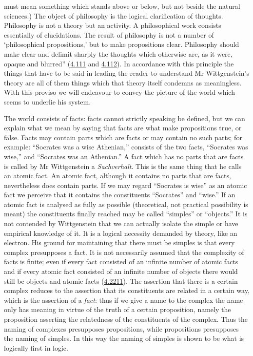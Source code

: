 \documentclass[12pt,oneside]{book}[2007/10/19]
\newcommand{\PropERef}[1]{\hyperref[PropE:#1]{#1}}
\newcommand{\DPtypo}[2]{#2}
\newcommand{\German}[1]{\foreignlanguage{german}{\emph{#1}}}
\begin{document}
must mean something which stands above or below, but
not beside the natural sciences.) The object of philosophy
is the logical clarification of thoughts. Philosophy is not
a theory but an activity. A philosophical work consists
essentially of elucidations. The result of philosophy is
not a number of `philosophical propositions,' but to
make propositions clear. Philosophy should make clear
and delimit sharply the thoughts which otherwise are,
as it were, opaque and blurred'' (\PropERef{4.111} and \PropERef{4.112}). In
accordance with this principle the things that have to be
said in leading the reader to understand Mr Wittgenstein's
theory are all of them things which that theory itself
condemns as meaningless. With this proviso we will
endeavour to convey the picture of the world which
seems to underlie his system.

The world consists of facts: facts cannot strictly
speaking be defined, but we can explain what we mean
by saying that facts are what make propositions true, or
false. Facts may contain parts which are facts or may
contain no such parts; for example: ``Socrates was a wise
Athenian,'' consists of the two facts, ``Socrates was wise,''
and ``Socrates was an Athenian.'' A fact which has no
parts that are facts is called by Mr Wittgenstein a \German{Sachverhalt}.
This is the same thing that he calls an atomic fact.
An atomic fact, although it contains no parts that are
facts, nevertheless does contain parts. If we may regard
``Socrates is wise'' as an atomic fact we perceive that it
contains the constituents ``Socrates'' and ``wise.'' If an
atomic fact is analysed as fully as \DPtypo{possibly}{possible} (theoretical,
not practical possibility is meant) the constituents finally
reached may be called ``simples'' or ``objects.'' It is not
contended by Wittgenstein that we can actually isolate
the simple or have empirical knowledge of it. It is a
logical necessity demanded by theory, like an electron.
His ground for maintaining that there must be simples
is that every complex presupposes a fact. It is not
necessarily assumed that the complexity of facts is finite;
even if every fact consisted of an infinite number of atomic
facts and if every atomic fact consisted of an infinite
number of objects there would still be objects and atomic
facts (\PropERef{4.2211}). The assertion that there is a certain
complex reduces to the assertion that its constituents
are related in a certain way, which is the assertion of
a \emph{fact}: thus if we give a name to the complex the name
only has meaning in virtue of the truth of a certain
proposition, namely the proposition asserting the relatedness
of the constituents of the complex. Thus the naming
of complexes presupposes propositions, while propositions
presupposes the naming of simples. In this way the
naming of simples is shown to be what is logically first
in logic.
\end{document}
